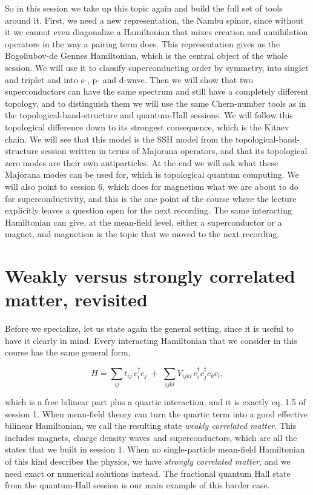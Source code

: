 So in this session we take up this topic again and build the full set of tools around it. First, we
need a new representation, the Nambu spinor, since without it we cannot even diagonalize a
Hamiltonian that mixes creation and annihilation operators in the way a pairing term does. This
representation gives us the Bogoliubov-de Gennes Hamiltonian, which is the central object of the
whole session. We will use it to classify superconducting order by symmetry, into singlet and
triplet and into s-, p- and d-wave. Then we will show that two superconductors can have the same
spectrum and still have a completely different topology, and to distinguish them we will use the
same Chern-number tools as in the topological-band-structure and quantum-Hall sessions. We will
follow this topological difference down to its strongest consequence, which is the Kitaev chain. We
will see that this model is the SSH model from the topological-band-structure session written in
terms of Majorana operators, and that its topological zero modes are their own antiparticles. At the
end we will ask what these Majorana modes can be used for, which is topological quantum computing.
We will also point to session 6, which does for magnetism what we are about to do for
superconductivity, and this is the one point of the course where the lecture explicitly leaves a
question open for the next recording. The same interacting Hamiltonian can give, at the mean-field
level, either a superconductor or a magnet, and magnetism is the topic that we moved to the next
recording.

\section{Weakly versus strongly correlated matter, revisited}

Before we specialize, let us state again the general setting, since it is useful to have it clearly
in mind. Every interacting Hamiltonian that we consider in this course has the same general form,

\begin{equation*}
H = \sum_{ij} t_{ij}\, c_i^\dagger c_j \;+\; \sum_{ijkl} V_{ijkl}\, c_i^\dagger c_j^\dagger c_k c_l,
\end{equation*}

which is a free bilinear part plus a quartic interaction, and it is exactly eq. 1.5 of session 1.
When mean-field theory can turn the quartic term into a good effective bilinear Hamiltonian, we call
the resulting state \emph{weakly correlated matter}. This includes magnets, charge density waves and
superconductors, which are all the states that we built in session 1. When no single-particle
mean-field Hamiltonian of this kind describes the physics, we have \emph{strongly correlated
matter}, and we need exact or numerical solutions instead. The fractional quantum Hall state from
the quantum-Hall session is our main example of this harder case.

